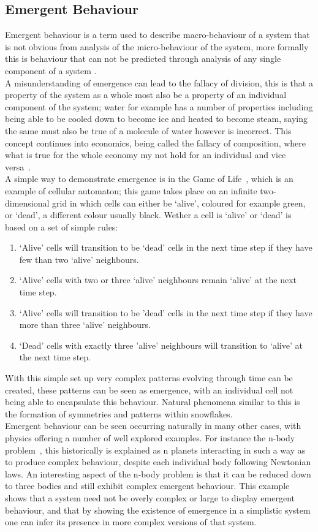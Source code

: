\documentclass{article}
\begin{document}
\subsection{Emergent Behaviour}
Emergent behaviour is a term used to describe macro-behaviour of a system that is not obvious from analysis of the micro-behaviour of the system, more formally this is behaviour that can not be predicted through analysis of any single component of a system \cite{EB_systemofsystemsGLangford}.\\
A misunderstanding of emergence can lead to the fallacy of division, this is that a property of the system as a whole most also be a property of an individual component of the system; water for example has a number of properties including being able to be cooled down to become ice and heated to become steam, saying the same must also be true of a molecule of water however is incorrect. This concept continues into economics, being called the fallacy of composition, where what is true for the whole economy my not hold for an individual and vice versa~\cite{fallacyofcompostionBook}.\\       
A simple way to demonstrate emergence is in the Game of Life~\cite{gameoflifepage}, which is an example of cellular automaton; this game takes place on an infinite two-dimensional grid in which cells can either be `alive', coloured for example green, or `dead', a different colour usually black. Wether a cell is `alive' or `dead' is based on a set of simple rules:   
\begin{enumerate}
  \item `Alive' cells will transition to be `dead' cells in the next time step if they have few than two `alive' neighbours.
  \item `Alive' cells with two or three `alive' neighbours remain `alive' at the next time step.
  \item `Alive' cells will transition to be 'dead' cells in the next time step if they have more than three `alive' neighbours.
  \item `Dead' cells with exactly three 'alive' neighbours will transition to `alive' at the next time step.
\end{enumerate}
With this simple set up very complex patterns evolving through time can be created, these patterns can be seen as emergence, with an individual cell not being able to encapsulate this behaviour. Natural phenomena similar to this is the formation of symmetries and patterns within snowflakes.\\
Emergent behaviour can be seen occurring naturally in many other cases, with physics offering a number of well explored examples. For instance the n-body problem~\cite{nbodyproblem}, this historically is explained as n planets interacting in such a way as to produce complex behaviour, despite each individual body following Newtonian laws. An interesting aspect of the n-body problem is that it can be reduced down to three bodies and still exhibit complex emergent behaviour. This example shows that a system need not be overly complex or large to display emergent behaviour, and that by showing the existence of emergence in a simplistic system one can infer its presence in more complex versions of that system.   
\end{document}
